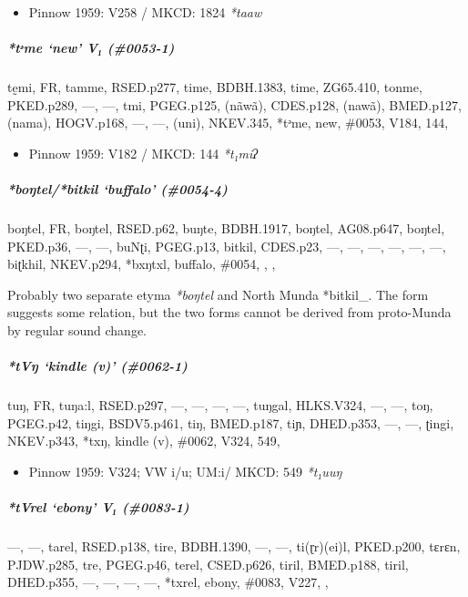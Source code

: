 \documentclass[a4paper,]{article}
\providecommand{\tightlist}{%
  \setlength{\itemsep}{0pt}\setlength{\parskip}{0pt}}
\let\oldsubparagraph\subparagraph
\renewcommand{\subparagraph}[1]{\oldsubparagraph{#1}\mbox{}}
\begin{document}
\begin{itemize}
\tightlist
\item
  Pinnow 1959: V258 / MKCD: 1824 \emph{*taaw}
\end{itemize}

\subparagraph{\texorpdfstring{\emph{*tᵊme} `new' V₁
(\#0053-1)}{*tᵊme new V₁ (\#0053-1)}}\label{tux1d4ame-new-v-0053-1}

tḛmi, FR, tamme, RSED.p277, time, BDBH.1383, time, ZG65.410, tonme,
PKED.p289, ---, ---, tmi, PGEG.p125, (nãwã), CDES.p128, (nawã),
BMED.p127, (nama), HOGV.p168, ---, ---, (uni), NKEV.345, *tᵊme, new,
\#0053, V184, 144,

\begin{itemize}
\tightlist
\item
  Pinnow 1959: V182 / MKCD: 144 \emph{*t₁miʔ}
\end{itemize}

\subparagraph{\texorpdfstring{\emph{*boŋtel}/\emph{*bitkil} `buffalo'
(\#0054-4)}{*boŋtel/*bitkil buffalo (\#0054-4)}}\label{boux14btelbitkil-buffalo-0054-4}

boŋtel, FR, boŋtel, RSED.p62, buŋte, BDBH.1917, boŋtel, AG08.p647,
boŋtel, PKED.p36, ---, ---, buNʈi, PGEG.p13, bitkil, CDES.p23, ---, ---,
---, ---, ---, ---, biʈkhil, NKEV.p294, *bxŋtxl, buffalo, \#0054, , ,

Probably two separate etyma \emph{*boŋtel} and North Munda *bitkil\_.
The form suggests some relation, but the two forms cannot be derived
from proto-Munda by regular sound change.

\subparagraph{\texorpdfstring{\emph{*tVŋ} `kindle (v)'
(\#0062-1)}{*tVŋ kindle (v) (\#0062-1)}}\label{tvux14b-kindle-v-0062-1}

tuŋ, FR, tuŋa:l, RSED.p297, ---, ---, ---, ---, tuŋgal, HLKS.V324, ---,
---, toŋ, PGEG.p42, tiŋgi, BSDV5.p461, tiŋ, BMED.p187, tiɲ, DHED.p353,
---, ---, ʈingi, NKEV.p343, *txŋ, kindle (v), \#0062, V324, 549,

\begin{itemize}
\tightlist
\item
  Pinnow 1959: V324; VW i/u; UM:i/ MKCD: 549 \emph{*t₁uuŋ}
\end{itemize}

\subparagraph{\texorpdfstring{\emph{*tVrel} `ebony' V₁
(\#0083-1)}{*tVrel ebony V₁ (\#0083-1)}}\label{tvrel-ebony-v-0083-1}

---, ---, tarel, RSED.p138, tire, BDBH.1390, ---, ---, ti(ɽr)(ei)l,
PKED.p200, tɛrɛn, PJDW.p285, tre, PGEG.p46, terel, CSED.p626, tiril,
BMED.p188, tiril, DHED.p355, ---, ---, ---, ---, *txrel, ebony, \#0083,
V227, ,
\end{document}
